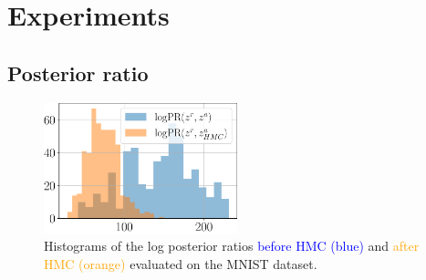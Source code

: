 
\section{Experiments} \label{sec:experiments}
\subsection{Posterior ratio}\label{sec:exp_ratio}

\begin{figure}[t]
	\centering
	\includegraphics[width=0.5\textwidth]{pics/3_adv_att/mnist_posterior_ratio.pdf}
	\caption{Histograms of the log posterior ratios \textcolor{blue}{before HMC (blue)} and \textcolor{orange}{after HMC (orange)} evaluated on the MNIST dataset.}
	\label{fig:mnist_post_ratio_main}
    \vskip 15pt
\end{figure}

